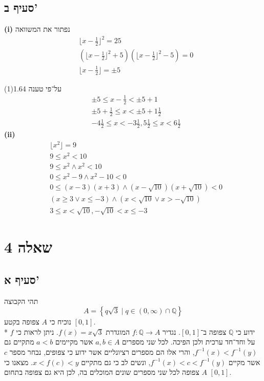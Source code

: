 \documentclass[a4paper]{article}
\def\QQ{\mathbb{Q}}
\begin{document}
\subsection{סעיף ב'}
\textbf{(i)}
נפתור את המשוואה
\begin{align*}
	& \lfloor x - \frac{1}{2} \rfloor^2 = 25 \\
	& (\lfloor x - \frac{1}{2} \rfloor^2 + 5)(\lfloor x - \frac{1}{2} \rfloor^2 - 5) = 0 \\
	& \lfloor x - \frac{1}{2} \rfloor = \pm 5
\end{align*}

על־פי טענה 1.64(1)
\begin{align*}
	& \pm 5 \le x - \frac{1}{2} < \pm 5 + 1 \\
	& \pm 5 + \frac{1}{2} \le x < \pm 5 + 1\frac{1}{2}  \\
	& -4 \frac{1}{2} \le x < -3\frac{1}{2}, 5\frac{1}{2} \le x < 6\frac{1}{2}
\end{align*}
\textbf{(ii)}
\begin{align*}
	& \lfloor x^2 \rfloor = 9 \\
	& 9 \le x^2 < 10 \\
	& 9 \le x^2 \land x^2 < 10 \\
	& 0 \le x^2 - 9 \land x^2 - 10 < 0 \\
	& 0 \le (x - 3)(x + 3) \land (x - \sqrt{10})(x + \sqrt{10}) < 0 \\
	& (x \ge 3 \lor x \le -3) \land (x < \sqrt{10} \lor x > -\sqrt{10}) \\
	& 3 \le x < \sqrt{10}, -\sqrt{10} < x \le -3
\end{align*}

\section{שאלה 4}
\subsection{סעיף א'}
תהי הקבוצה
\[
	A = \left\{ q \sqrt{3} \mid q \in (0, \infty) \cap \QQ \right\}
\]
נוכיח כי $A$ צפופה בקטע $[0, 1]$. \\*
ידוע כי $\QQ$ צפופה ב־$[0, 1]$.
נגדיר $f : \QQ \to A$ המוגדרת $f(x) = x \sqrt{3}$. ניתן לראות כי $f$ על וחד־חד ערכית ולכן הפיכה.
לכל שני מספרים $a, b \in A$ אשר מקיימים $a < b$ מתקיים גם $f^{-1}(x) < f^{-1}(y)$, והרי אלו הם מספרים רציונליים אשר ידוע כי צפופים,
נבחר מספר $c$ אשר מקיים $f^{-1}(x) < c < f^{-1}(y)$, ונשים לב כי גם מתקיים $x < f(c) < y$.
מצאנו כי $A$ צפופה לכל שני מספרים שונים המוכלים בה, לכן היא גם צפופה בתחום $[0, 1]$.
\end{document}
